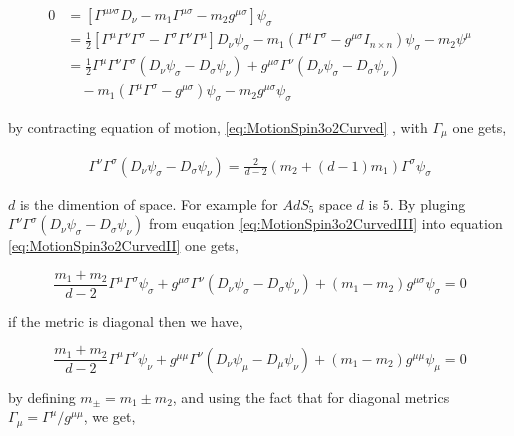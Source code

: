 \begin{align} \label{eq:MotionSpin3o2CurvedII}
   0 &= \left[\Gamma^{\mu\nu\sigma} D_{\nu} - m_1\Gamma^{\mu\sigma} - m_2 g^{\mu\sigma} \right] \psi_{\sigma} \\
     &= \frac{1}{2} \left[\Gamma^{\mu}\Gamma^{\nu}\Gamma^{\sigma} - \Gamma^{\sigma}\Gamma^{\nu}\Gamma^{\mu}\right] D_{\nu}\psi_{\sigma} - m_1(\Gamma^{\mu}\Gamma^{\sigma} - g^{\mu\sigma}I_{n \times n}) \psi_{\sigma} - m_2 \psi^{\mu} \nonumber\\
     &= \frac{1}{2}\Gamma^{\mu}\Gamma^{\nu}\Gamma^{\sigma} (D_{\nu}\psi_{\sigma} - D_{\sigma}\psi_{\nu}) + g^{\mu\sigma}\Gamma^{\nu}(D_{\nu}\psi_{\sigma} - D_{\sigma}\psi_{\nu}) \nonumber\\
     & \quad - m_1(\Gamma^{\mu}\Gamma^{\sigma} - g^{\mu\sigma}) \psi_{\sigma} - m_2 g^{\mu\sigma}\psi_{\sigma} \nonumber
\end{align}

by contracting equation of motion, \ref{eq:MotionSpin3o2Curved} , with $\Gamma_{\mu}$ one gets,

\begin{align} \label{eq:MotionSpin3o2CurvedIII}
   \Gamma^{\nu}\Gamma^{\sigma} (D_{\nu}\psi_{\sigma} - D_{\sigma}\psi_{\nu}) = \frac{2}{d-2}(m_2+(d-1)m_1)\Gamma^{\sigma}\psi_{\sigma}
\end{align}

$d$ is the dimention of space. For example for $AdS_5$ space $d$ is $5$. By pluging $\Gamma^{\nu}\Gamma^{\sigma} (D_{\nu}\psi_{\sigma} - D_{\sigma}\psi_{\nu})$ from euqation \ref{eq:MotionSpin3o2CurvedIII} into equation \ref{eq:MotionSpin3o2CurvedII} one gets,

\begin{equation}
   \frac{m_1 + m_2}{d-2}\Gamma^{\mu}\Gamma^{\sigma}\psi_{\sigma} + g^{\mu\sigma}\Gamma^{\nu}(D_{\nu}\psi_{\sigma} - D_{\sigma}\psi_{\nu}) + (m_1 - m_2) g^{\mu\sigma}\psi_{\sigma} = 0
\end{equation}

if the metric is diagonal then we have,

\begin{equation}
   \frac{m_1 + m_2}{d-2}\Gamma^{\mu}\Gamma^{\nu}\psi_{\nu} + g^{\mu\mu}\Gamma^{\nu}(D_{\nu}\psi_{\mu} - D_{\mu}\psi_{\nu}) + (m_1 - m_2) g^{\mu\mu}\psi_{\mu} = 0
\end{equation}

by defining $m_{\pm} = m_1 \pm m_2$, and using the fact that for diagonal metrics $\Gamma_{\mu} = \Gamma^{\mu}/g^{\mu\mu}$, we get,

